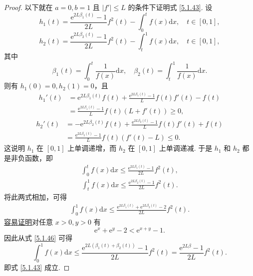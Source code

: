 \documentclass[../../main.tex]{subfiles}%
\begin{document}
\begin{proof}
以下就在 $a = 0, b = 1$ 且 $|f'| \leqslant L$ 的条件下证明式 \eqref{5.1.43}. 设
$$h_1(t) = \frac{\mathrm{e}^{2L\beta_1(t)} - 1}{2L} f^2(t) - \int_0^t f(x) \mathrm{d}x, \quad t \in [0,1],$$
$$h_2(t) = \frac{\mathrm{e}^{2L\beta_2(t)} - 1}{2L} f^2(t) - \int_t^1 f(x) \mathrm{d}x, \quad t \in [0,1],$$
其中
$$\beta_1(t) = \int_0^t \frac{1}{f(x)} \mathrm{d}x, \quad \beta_2(t) = \int_t^1 \frac{1}{f(x)} \mathrm{d}x.$$
则有 $h_1(0) = 0, h_2(1) = 0$，且
$$
\begin{aligned}
h_1'(t) &= \mathrm{e}^{2L\beta_1(t)} f(t) + \frac{\mathrm{e}^{2L\beta_1(t)} - 1}{L} f(t) f'(t) - f(t) \\
&= \frac{\mathrm{e}^{2L\beta_1(t)} - 1}{L} f(t) (L + f'(t)) \geqslant 0,
\end{aligned}
$$
$$
\begin{aligned}
h_2'(t) &= -\mathrm{e}^{2L\beta_2(t)} f(t) + \frac{\mathrm{e}^{2L\beta_2(t)} - 1}{L} f(t) f'(t) + f(t) \\
&= \frac{\mathrm{e}^{2L\beta_2(t)} - 1}{L} f(t) (f'(t) - L) \leqslant 0.
\end{aligned}
$$
这说明 $h_1$ 在 $[0,1]$ 上单调递增，而 $h_2$ 在 $[0,1]$ 上单调递减. 于是 $h_1$ 和 $h_2$ 都是非负函数，即
\begin{align}
\int_0^t f(x) \mathrm{d}x \leqslant \frac{\mathrm{e}^{2L\beta_1(t)} - 1}{2L} f^2(t), \label{5.1.44}
\end{align}
\begin{align}
\int_t^1 f(x) \mathrm{d}x \leqslant \frac{\mathrm{e}^{2L\beta_2(t)} - 1}{2L} f^2(t). \label{5.1.45}
\end{align}
将此两式相加，可得
\begin{align}
\int_0^1 f(x) \mathrm{d}x \leqslant \frac{\mathrm{e}^{2L\beta_1(t)} + \mathrm{e}^{2L\beta_2(t)} - 2}{2L} f^2(t). \label{5.1.46}
\end{align}
\hyperref[proposition:指数对数函数不等式3]{容易证明}对任意 $x > 0, y > 0$ 有
$$\mathrm{e}^x + \mathrm{e}^y - 2 < \mathrm{e}^{x + y} - 1.$$
因此从式 \eqref{5.1.46} 可得
$$\int_0^1 f(x) \mathrm{d}x \leqslant \frac{\mathrm{e}^{2L(\beta_1(t) + \beta_2(t))} - 1}{2L} f^2(t) = \frac{\mathrm{e}^{2L\beta} - 1}{2L} f^2(t).$$
即式 \eqref{5.1.43} 成立.
\end{proof}
\end{document}
